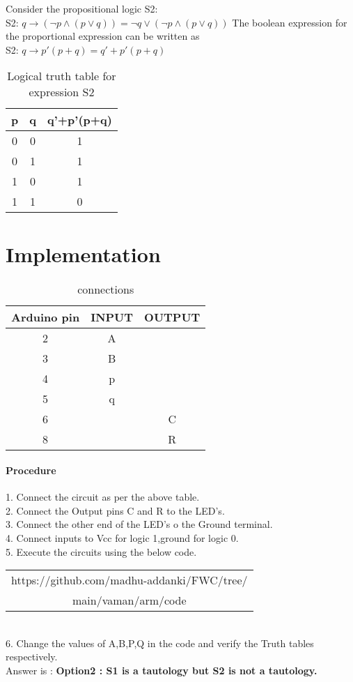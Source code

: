 \documentclass[journal,12pt,twocolumn]{IEEEtran}
\begin{document}
Consider the propositional logic S2:\\
  S2: $q \longrightarrow (\neg{p}\land({p}\lor{q})) = \neg{q} \lor (\neg{p} \land ({p}\lor {q}))$
 The boolean expression for the proportional expression can be written as\\
 S2: $q \longrightarrow p'(p+q) = q'+p'(p+q)$
\begin{table}[h]
	\centering
	\caption{Logical truth table for expression S2}
	\begin{tabular}{|c|c|c|}
		\hline
		p & q & q'+p'(p+q)\\
		\hline
		0 & 0 & 1\\
		\hline
		0 & 1 & 1\\
		\hline
		1 & 0 & 1\\
		\hline
		1 & 1 & 0\\
		\hline
	\end{tabular}
\end{table}



\section{Implementation}

\begin{table}[h]
  \centering
  \caption{connections}
  \begin{tabular}{|c|c|c|}
\hline
Arduino pin & INPUT & OUTPUT\\
\hline
2 & A &\\
\hline
3 & B &\\
\hline
4 & p &\\
\hline
5 & q &\\
\hline
6 & & C\\
\hline
8 & & R\\
\hline
  \end{tabular}
\end{table}

\paragraph{Procedure}

   1. Connect the circuit as per the above table.\\
   2. Connect the Output pins C and R to the LED's.\\
   3. Connect the other end of the LED's o the Ground terminal.\\
   4. Connect inputs to Vcc for logic 1,ground for logic 0.\\
   5. Execute the circuits using the below code.\\
   \begin{table}[h]
	   \centering
	   \begin{tabular}{|c|}
	   \hline
	   https://github.com/madhu-addanki/FWC/tree/\\
        	main/vaman/arm/code\\
	   \hline
	   \end{tabular}
   \end{table}\\
   6. Change the values of A,B,P,Q in the code and verify the Truth tables respectively.\\

   Answer is :
   \textbf{Option2 : S1 is a tautology but S2 is not a tautology.}

\end{document}
